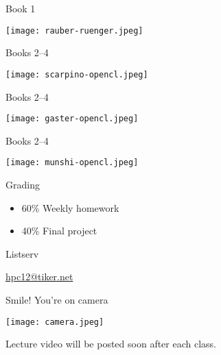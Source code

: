 \documentclass[english,compress]{beamer}
\begin{document}
\begin{frame}{Book 1}
  \begin{center}
    \texttt{[image: rauber-ruenger.jpeg]}
  \end{center}
\end{frame}
\begin{frame}{Books 2--4}
  \begin{center}
    \texttt{[image: scarpino-opencl.jpeg]}
  \end{center}
\end{frame}
\begin{frame}{Books 2--4}
  \begin{center}
    \texttt{[image: gaster-opencl.jpeg]}
  \end{center}
\end{frame}
\begin{frame}{Books 2--4}
  \begin{center}
    \texttt{[image: munshi-opencl.jpeg]}
  \end{center}
\end{frame}
\begin{frame}{Grading}
  \Large
  \begin{itemize}
    \item 60\% Weekly homework
    \item 40\% Final project
  \end{itemize}
\end{frame}
\begin{frame}{Listserv}
  \begin{center}
    \Huge
    \href{mailto:hpc12@tiker.net}{hpc12@tiker.net}
  \end{center}
\end{frame}
\begin{frame}{Smile! You're on camera}
  \begin{center}
    \texttt{[image: camera.jpeg]}

    Lecture video will be posted soon after each class.
  \end{center}
\end{frame}
\end{document}

